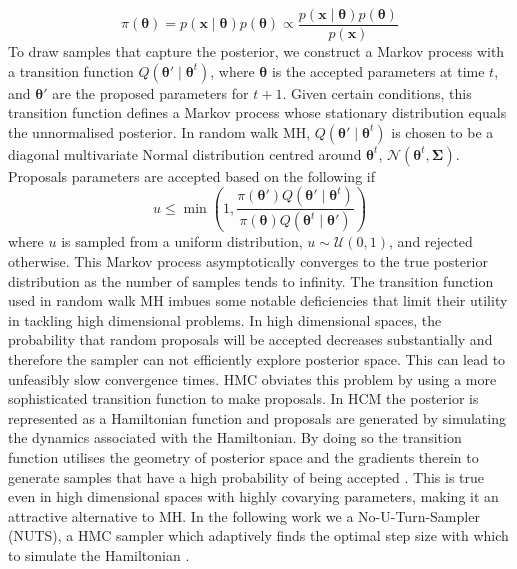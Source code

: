 \begin{equation}
    \label{eqn:unnormalisedpdf}
    \pi(\boldsymbol\theta) = p(\mathbf{x} \mid \boldsymbol{\theta})p(\boldsymbol{\theta}) \propto 
    \frac{p(\mathbf{x} \mid \boldsymbol{\theta})p(\boldsymbol{\theta})}{p(\mathbf{x})}
\end{equation}
To draw samples that capture the posterior, we construct a Markov
process with a transition function $Q(\boldsymbol\theta' \mid
\boldsymbol\theta^t)$, where $\boldsymbol\theta$ is the accepted parameters at
time $t$, and $\boldsymbol\theta'$ are the proposed parameters for $t+1$. Given
certain conditions, this transition function defines a Markov process whose
stationary distribution equals the unnormalised posterior. In random walk MH,
$Q(\boldsymbol\theta' \mid \boldsymbol\theta^t)$ is chosen to be a diagonal
multivariate Normal distribution centred around $\boldsymbol\theta^t$,
$\mathcal{N}(\boldsymbol\theta^t, \boldsymbol\Sigma)$. Proposals
parameters are accepted based on the following if 
\begin{equation}
    u \leq \min\left(1, 
    \frac{\pi(\boldsymbol\theta') Q(\boldsymbol\theta' \mid \boldsymbol\theta^t)}
    {\pi(\boldsymbol\theta) Q(\boldsymbol\theta^t \mid \boldsymbol\theta')}\right)       
\end{equation}
where $u$ is sampled from a uniform distribution, $u \sim \mathcal{U}(0, 1)$,
and rejected otherwise. This Markov process asymptotically converges to the true
posterior distribution as the number of samples tends to infinity. The
transition function used in random walk MH imbues some notable deficiencies that
limit their utility in tackling high dimensional problems. In high dimensional
spaces, the probability that random proposals will be accepted decreases
substantially and therefore the sampler can not efficiently explore posterior
space. This can lead to unfeasibly slow convergence times. HMC obviates this
problem by using a more sophisticated transition function to make proposals. In
HCM the posterior is represented as a Hamiltonian function and proposals are
generated by simulating the dynamics associated with the Hamiltonian. By doing
so the transition function utilises the geometry of posterior space and the
gradients therein to generate samples that have a high probability of being
accepted \cite{betancourt2017conceptual, neal2011mcmc}. This is true even in
high dimensional spaces with highly covarying parameters, making it an attractive
alternative to MH. In the following work we a No-U-Turn-Sampler (NUTS), a HMC
sampler which adaptively finds the optimal step size with which to simulate the
Hamiltonian \cite{hoffman2014no}.

